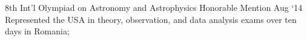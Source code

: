 \experience
    {8th Int'l Olympiad on Astronomy and Astrophysics}
    {Honorable Mention}
    {Aug `14}
    {
        Represented the USA in theory, observation, and data analysis exams over ten days in
        Romania;
    }
